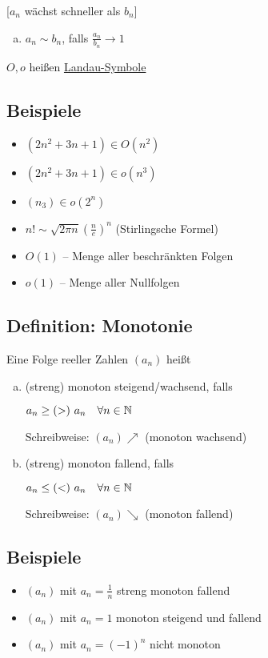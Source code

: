 \documentclass[10pt,a4paper]{article}
\begin{document}
    [$a_n$ wächst schneller als $b_n$]

    \begin{enumerate}[a), resume]
        \item $a_n \sim b_n$, falls $\frac{a_n}{b_n} \to 1$
    \end{enumerate}

    $O, o$ heißen \underline{Landau-Symbole}

    \subsection{Beispiele}
    \begin{itemize}
        \item $(2n^2 + 3n + 1) \in O(n^2)$
        \item $(2n^2 + 3n + 1) \in o(n^3)$
        \item $(n_3) \in o(2^n)$
        \item $n! \sim \sqrt{2 \pi n} \left(\frac{n}{e}\right)^n$ (Stirlingsche Formel)
        \item $O(1)$ -- Menge aller beschränkten Folgen
        \item $o(1)$ -- Menge aller Nullfolgen
    \end{itemize}

    \subsection{Definition: Monotonie}

    Eine Folge reeller Zahlen $(a_n)$ heißt
    \begin{enumerate}[a)]
        \item (streng) monoton steigend/wachsend, falls

        $a_n \geq(>) \ a_n \quad \forall n \in \mathbb{N}$
        
        Schreibweise: $(a_n) \nearrow$ (monoton wachsend)
        \item (streng) monoton fallend, falls

        $a_n \leq(<) \ a_n \quad \forall n \in \mathbb{N}$
        
        Schreibweise: $(a_n) \searrow$ (monoton fallend)
    \end{enumerate}

    \subsection{Beispiele}
    \begin{itemize}
        \item $(a_n)$ mit $a_n = \frac{1}{n}$ streng monoton fallend
        \item $(a_n)$ mit $a_n = 1$ monoton steigend und fallend
        \item $(a_n)$ mit $a_n = (-1)^n$ nicht monoton
    \end{itemize}
\end{document}
